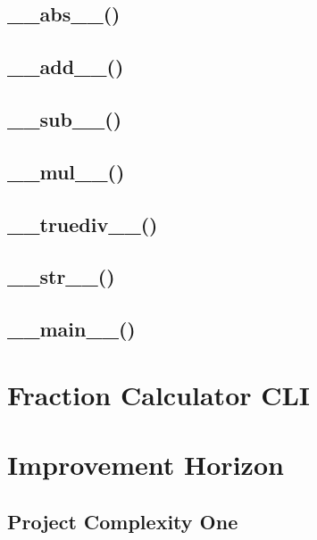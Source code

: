 \documentclass[refman]{scrartcl}
\begin{document}
\subsection{\_\_abs\_\_()}

\subsection{\_\_add\_\_()}

\subsection{\_\_sub\_\_()}

\subsection{\_\_mul\_\_()}

\subsection{\_\_truediv\_\_()}

\subsection{\_\_str\_\_()}

\subsection{\_\_main\_\_()}

\section{Fraction Calculator CLI}

\section{Improvement Horizon}

\subsection{Project Complexity One}

\subsection{}
\end{document}
